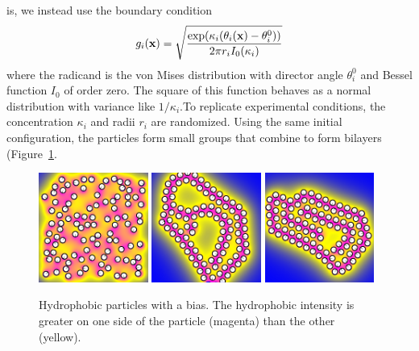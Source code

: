 is, we instead use the boundary condition
\begin{equation}
\label{eq:vonMises}
  g_i(\mathbf{x}) = \sqrt{
  \frac{\exp( \kappa_i(\theta_i(\mathbf{x}) - \theta^0_i))}
  {2\pi r_i I_0(\kappa_i)}}
\end{equation}
where the radicand  is the von Mises distribution with
director angle $\theta^0_i$ and Bessel function $I_0$ of order zero. The
square of this function behaves as a normal distribution with variance
like $1/\kappa_i$.To replicate experimental conditions, the
concentration $\kappa_i$ and radii $r_i$ are randomized. Using the same
initial configuration, the particles form small groups that
combine to form bilayers (Figure~\ref{fig:self-assemblyC}.


\begin{figure}[h!]
  \begin{center}
    \includegraphics[width=0.32\textwidth]{figures/SpecificAim1/N100C1.pdf}
    \includegraphics[width=0.32\textwidth]{figures/SpecificAim1/N100C2.pdf}
    \includegraphics[width=0.32\textwidth]{figures/SpecificAim1/N100C3.pdf}\\
    \caption{Hydrophobic particles with a bias. The hydrophobic
    intensity is greater on one side of the particle (magenta) than the
    other (yellow).
    \label{fig:self-assemblyC}}
\end{center}
\end{figure}

